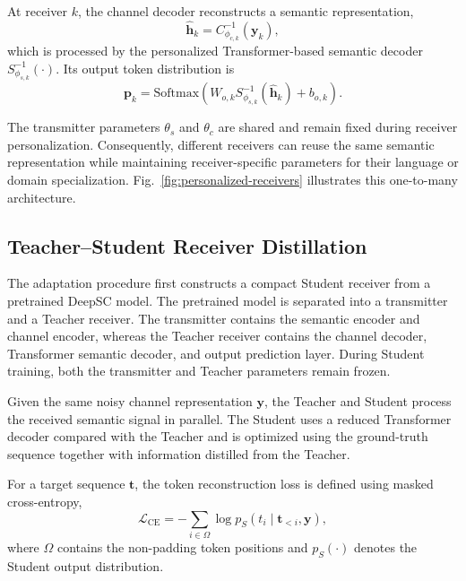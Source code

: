 \documentclass[conference]{IEEEtran}
\begin{document}
At receiver $k$, the channel decoder reconstructs a semantic representation,
\begin{equation}
    \hat{\mathbf{h}}_k
    =
    C^{-1}_{\phi_{c,k}}(\mathbf{y}_k),
\end{equation}
which is processed by the personalized Transformer-based semantic decoder $S^{-1}_{\phi_{s,k}}(\cdot)$. Its output token distribution is
\begin{equation}
    \mathbf{p}_k
    =
    \mathrm{Softmax}\left(
    W_{o,k}
    S^{-1}_{\phi_{s,k}}(\hat{\mathbf{h}}_k)
    +
    b_{o,k}
    \right).
\end{equation}

The transmitter parameters $\theta_s$ and $\theta_c$ are shared and remain fixed during receiver personalization. Consequently, different receivers can reuse the same semantic representation while maintaining receiver-specific parameters for their language or domain specialization. Fig.~\ref{fig:personalized-receivers} illustrates this one-to-many architecture.



\subsection{Teacher--Student Receiver Distillation}

The adaptation procedure first constructs a compact Student receiver from a pretrained DeepSC model. The pretrained model is separated into a transmitter and a Teacher receiver. The transmitter contains the semantic encoder and channel encoder, whereas the Teacher receiver contains the channel decoder, Transformer semantic decoder, and output prediction layer. During Student training, both the transmitter and Teacher parameters remain frozen.

Given the same noisy channel representation $\mathbf{y}$, the Teacher and Student process the received semantic signal in parallel. The Student uses a reduced Transformer decoder compared with the Teacher and is optimized using the ground-truth sequence together with information distilled from the Teacher.

For a target sequence $\mathbf{t}$, the token reconstruction loss is defined using masked cross-entropy,
\begin{equation}
    \mathcal{L}_{\mathrm{CE}}
    =
    -\sum_{i\in\Omega}
    \log p_S(t_i\mid\mathbf{t}_{<i},\mathbf{y}),
\end{equation}
where $\Omega$ contains the non-padding token positions and $p_S(\cdot)$ denotes the Student output distribution.
\end{document}
